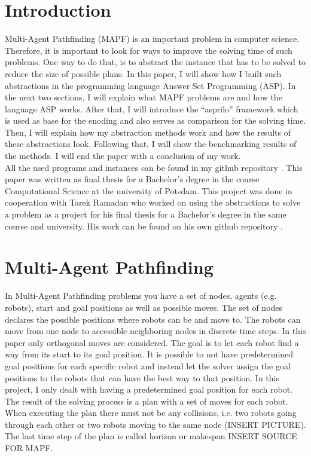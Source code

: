 \documentclass[runningheads]{llncs}
\begin{document}
\section{Introduction}
Multi-Agent Pathfinding (MAPF) is an important problem in computer science. Therefore, it is important to look for ways to improve the solving time of such problems. One way to do that, is to abstract the instance that has to be solved to reduce the size of
possible plans. In this paper, I will show how I built such abstractions in the programming language Answer Set Programming (ASP). In the next two sections, I will explain what MAPF problems are and how the language ASP works. After that, I will introduce the ``asprilo'' framework which is used as base for the enoding and also serves as comparison for the solving time. Then, I will explain how my abstraction methods work and how the results of these abstractions look. Following that, I will show the benchmarking results of the methods. I will end the paper with a conclusion of my work. \\
All the used programs and instances can be found in my github repository \cite{my-git}. This paper was written as final thesis for a Bachelor's degree in the course Computational Science at the university of Potsdam. This project was done in cooperation with Tarek Ramadan who worked on using the abstractions to solve a problem as a project for his final thesis for a Bachelor's degree in the same course and university. His work can be found on his own github repository \cite{tarek-git}.

\section{Multi-Agent Pathfinding}
In Multi-Agent Pathfinding problems you have a set of nodes, agents (e.g. robots), start and goal positions as well as possible moves. The set of nodes declares the possible positions where robots can be and move to. The robots can move from one node to accessible neighboring nodes in discrete time steps. In this paper only orthogonal moves are considered. The goal is to let each robot find a way from its start to its goal position. It is possible to not have predetermined goal positions for each specific robot and instead let the solver assign the goal positions to the robots that can have the best way to that position. In this project, I only dealt with having a predetermined goal position for each robot. The result of the solving process is a plan with a set of moves for each robot. When executing the plan there must not be any collisions, i.e. two robots going through each other or two robots moving to the same node (INSERT PICTURE). The last time step of the plan is called horizon or makespan INSERT SOURCE FOR MAPF. 
\end{document}
